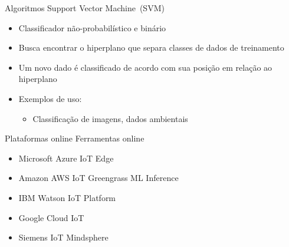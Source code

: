 \documentclass[t]{beamer}
\begin{document}
\begin{frame}{Algoritmos}
Support Vector Machine~(SVM)
\begin{itemize}
	\item Classificador não-probabilístico e binário
	\item Busca encontrar o hiperplano que separa classes de dados de treinamento
	\item Um novo dado é classificado de acordo com sua posição em relação ao hiperplano
	\item Exemplos de uso:
	\begin{itemize}
		\item Classificação de imagens, dados ambientais
	\end{itemize}
\end{itemize}
\end{frame}

\begin{frame}{Plataformas online}
Ferramentas online
\begin{itemize}
	\item Microsoft Azure IoT Edge
	\item Amazon AWS IoT Greengrass ML Inference
	\item IBM Watson IoT Platform
	\item Google Cloud IoT
	\item Siemens IoT Mindsphere
\end{itemize}
\end{frame}

\frame{\titlepage}
\end{document}
